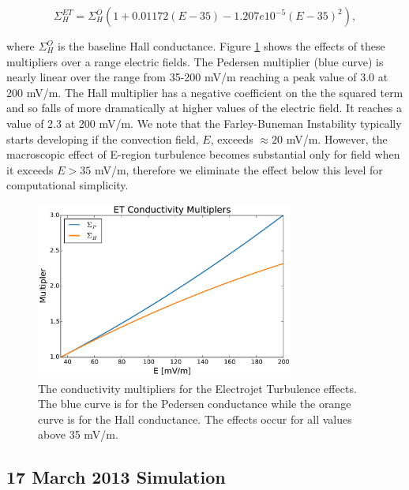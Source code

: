 \documentclass[draft,jgrga]{agutex}
\begin{document}
\begin{article}
\begin{equation}
\label{eq-sigmah-fbi}
\Sigma_H^{ET} = \Sigma_H^O(1+0.01172 (E - 35) - 1.207e10^{-5}(E - 35)^2),
\end{equation}

where $\Sigma_H^O$ is the baseline Hall conductance.   Figure \ref{fbi-multi-fig} shows the effects of these multipliers over a range electric fields.  The Pedersen multiplier (blue curve) is nearly linear over the range from 35-200 mV/m reaching a peak value of 3.0 at 200 mV/m.  The Hall multiplier has a negative coefficient on the the squared term and so falls of more dramatically at higher values of the electric field.  It reaches a value of 2.3 at 200 mV/m.  We note that the Farley-Buneman Instability typically starts developing if the convection field, $E$, exceeds $\approx20$ mV/m. However, the macroscopic effect of E-region turbulence becomes substantial only for field when it exceeds $E>35$ mV/m, therefore we eliminate the effect below this level for computational simplicity. 

\begin{figure}
\noindent\includegraphics[width=20pc]{JGRPaper-ConductMulti.pdf}
\caption{\label{fbi-multi-fig} 
The conductivity multipliers for the Electrojet Turbulence effects.  The blue curve is for the Pedersen conductance while the orange curve is for the Hall conductance.  The effects occur for all values above 35 mV/m.  } 
\end{figure}

\subsection{17 March 2013 Simulation}
\label{sec-17mar13}


\end{article}
\end{document}
